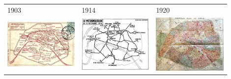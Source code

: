 \hspace{-0.5cm}
\begin{tabular}{|m{0.3\linewidth}|m{0.3\linewidth}|m{0.3\linewidth}|}
\hline
1903 & 1914 & 1920\\
\includegraphics[width=\linewidth]{img/1903}&
\includegraphics[width=\linewidth]{img/1914}&
\includegraphics[width=\linewidth]{img/1920}\\

\end{tabular}
